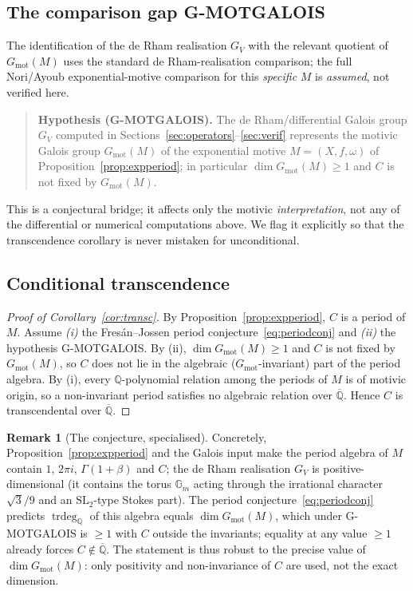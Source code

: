 \documentclass[11pt,reqno]{amsart}
\theoremstyle{plain}
\theoremstyle{definition}
\newtheorem{remark}[theorem]{Remark}
\newcommand{\Qbar}{\overline{\mathbb{Q}}}
\newcommand{\SL}{\mathrm{SL}}
\newcommand{\Gm}{\mathbb{G}_m}
\providecommand{\C}{}\renewcommand{\C}{C}
\begin{document}
\subsection{The comparison gap G-MOTGALOIS}
The identification of the de Rham realisation $G_V$ with the relevant quotient of
$G_{\mathrm{mot}}(M)$ uses the standard de Rham-realisation comparison; the full Nori/Ayoub
exponential-motive comparison for this \emph{specific} $M$ is \emph{assumed}, not verified here.

\begin{quote}
\textbf{Hypothesis (G-MOTGALOIS).} The de Rham/differential Galois group $G_V$ computed in
Sections~\ref{sec:operators}--\ref{sec:verif} represents the motivic Galois group
$G_{\mathrm{mot}}(M)$ of the exponential motive $M=(X,f,\omega)$ of
Proposition~\ref{prop:expperiod}; in particular $\dim G_{\mathrm{mot}}(M)\ge1$ and $\C$ is not
fixed by $G_{\mathrm{mot}}(M)$.
\end{quote}

This is a conjectural bridge; it affects only the motivic \emph{interpretation}, not any of the
differential or numerical computations above. We flag it explicitly so that the transcendence
corollary is never mistaken for unconditional.

\subsection{Conditional transcendence}
\begin{proof}[Proof of Corollary~\ref{cor:transc}]
By Proposition~\ref{prop:expperiod}, $\C$ is a period of $M$. Assume \emph{(i)} the
Fres\'an--Jossen period conjecture~\eqref{eq:periodconj} and \emph{(ii)} the hypothesis
G-MOTGALOIS. By (ii), $\dim G_{\mathrm{mot}}(M)\ge1$ and $\C$ is not fixed by
$G_{\mathrm{mot}}(M)$, so $\C$ does not lie in the algebraic ($G_{\mathrm{mot}}$-invariant)
part of the period algebra. By (i), every $\mathbb{Q}$-polynomial relation among the periods of
$M$ is of motivic origin, so a non-invariant period satisfies no algebraic relation over
$\Qbar$. Hence $\C$ is transcendental over $\Qbar$.
\end{proof}

\begin{remark}[The conjecture, specialised]\label{rmk:specialised}
Concretely, Proposition~\ref{prop:expperiod} and the Galois input make the period
algebra of $M$ contain $1$, $2\pi i$, $\Gamma(1+\beta)$ and $\C$; the de Rham realisation $G_V$ is
positive-dimensional (it contains the torus $\Gm$ acting through the irrational character
$\sqrt3/9$ and an $\SL_2$-type Stokes part). The period conjecture~\eqref{eq:periodconj} predicts
$\operatorname{trdeg}_{\mathbb{Q}}$ of this algebra equals $\dim G_{\mathrm{mot}}(M)$, which under
G-MOTGALOIS is $\ge1$ with $\C$ outside the invariants; equality at any value $\ge1$ already forces
$\C\notin\Qbar$. The statement is thus robust to the precise value of $\dim G_{\mathrm{mot}}(M)$:
only positivity and non-invariance of $\C$ are used, not the exact dimension.
\end{remark}
\end{document}
